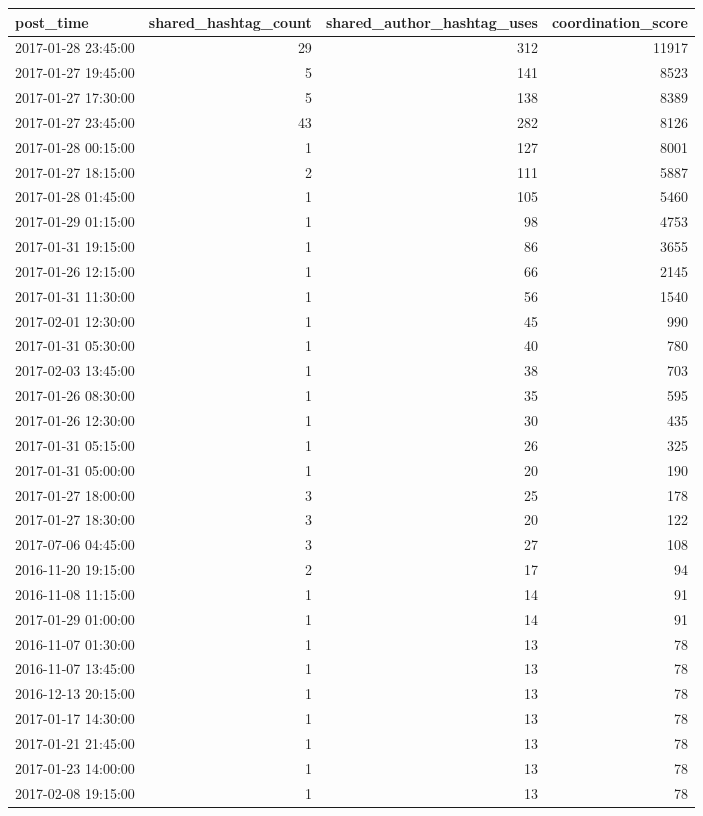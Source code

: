 \begin{tabular}{lrrr}
\toprule
post\_time & shared\_hashtag\_count & shared\_author\_hashtag\_uses & coordination\_score \\
\midrule
2017-01-28 23:45:00 & 29 & 312 & 11917 \\
2017-01-27 19:45:00 & 5 & 141 & 8523 \\
2017-01-27 17:30:00 & 5 & 138 & 8389 \\
2017-01-27 23:45:00 & 43 & 282 & 8126 \\
2017-01-28 00:15:00 & 1 & 127 & 8001 \\
2017-01-27 18:15:00 & 2 & 111 & 5887 \\
2017-01-28 01:45:00 & 1 & 105 & 5460 \\
2017-01-29 01:15:00 & 1 & 98 & 4753 \\
2017-01-31 19:15:00 & 1 & 86 & 3655 \\
2017-01-26 12:15:00 & 1 & 66 & 2145 \\
2017-01-31 11:30:00 & 1 & 56 & 1540 \\
2017-02-01 12:30:00 & 1 & 45 & 990 \\
2017-01-31 05:30:00 & 1 & 40 & 780 \\
2017-02-03 13:45:00 & 1 & 38 & 703 \\
2017-01-26 08:30:00 & 1 & 35 & 595 \\
2017-01-26 12:30:00 & 1 & 30 & 435 \\
2017-01-31 05:15:00 & 1 & 26 & 325 \\
2017-01-31 05:00:00 & 1 & 20 & 190 \\
2017-01-27 18:00:00 & 3 & 25 & 178 \\
2017-01-27 18:30:00 & 3 & 20 & 122 \\
2017-07-06 04:45:00 & 3 & 27 & 108 \\
2016-11-20 19:15:00 & 2 & 17 & 94 \\
2016-11-08 11:15:00 & 1 & 14 & 91 \\
2017-01-29 01:00:00 & 1 & 14 & 91 \\
2016-11-07 01:30:00 & 1 & 13 & 78 \\
2016-11-07 13:45:00 & 1 & 13 & 78 \\
2016-12-13 20:15:00 & 1 & 13 & 78 \\
2017-01-17 14:30:00 & 1 & 13 & 78 \\
2017-01-21 21:45:00 & 1 & 13 & 78 \\
2017-01-23 14:00:00 & 1 & 13 & 78 \\
2017-02-08 19:15:00 & 1 & 13 & 78 \\

\end{tabular}
